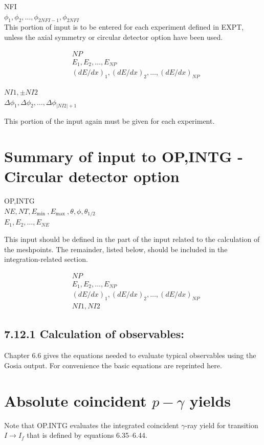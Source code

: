 \documentclass[10pt]{article}
\begin{document}
NFI\\
$\phi_{1}, \phi_{2}, \ldots, \phi_{2 N F I-1}, \phi_{2 N F I}$\\
This portion of input is to be entered for each experiment defined in EXPT, unless the axial symmetry or circular detector option have been used.

$$
\begin{aligned}
& N P \\
& E_{1}, E_{2}, \ldots, E_{N P} \\
& (d E / d x)_{1},(d E / d x)_{2}, \ldots,(d E / d x)_{N P}
\end{aligned}
$$

$N I 1, \pm N I 2$\\
$\Delta \phi_{1}, \Delta \phi_{2}, \ldots, \Delta \phi_{|N I 2|+1}$

This portion of the input again must be given for each experiment.

\section*{Summary of input to OP,INTG - Circular detector option}
OP,INTG\\
$N E, N T, E_{\text {min }}, E_{\text {max }}, \theta, \phi, \theta_{1 / 2}$\\
$E_{1}, E_{2}, \ldots, E_{N E}$

This input should be defined in the part of the input related to the calculation of the meshpoints. The remainder, listed below, should be included in the integration-related section.

$$
\begin{aligned}
& N P \\
& E_{1}, E_{2}, \ldots, E_{N P} \\
& (d E / d x)_{1},(d E / d x)_{2}, \ldots,(d E / d x)_{N P} \\
& N I 1, N I 2
\end{aligned}
$$

\subsection*{7.12.1 Calculation of observables:}
Chapter 6.6 gives the equations needed to evaluate typical observables using the Gosia output. For convenience the basic equations are reprinted here.

\section*{Absolute coincident $p-\gamma$ yields}
Note that OP.INTG evaluates the integrated coincident $\gamma$-ray yield for transition $I \rightarrow I_{f}$ that is defined by equations 6.35--6.44.
\end{document}
